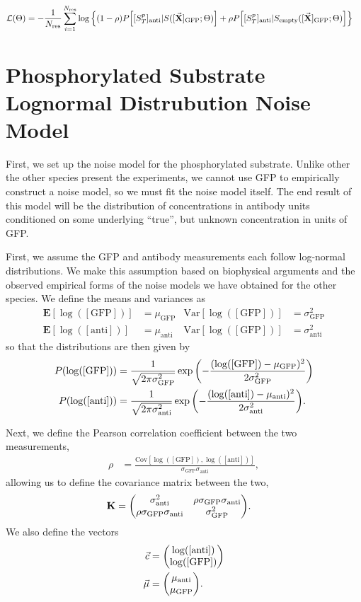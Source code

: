 \documentclass[aps,onecolumn,superscriptaddress,notitlepage]{revtex4-1}
\newcommand{\sigmaGFP}{\sigma_{\mathrm{GFP}}}
\newcommand{\sigmaanti}{\sigma_{\mathrm{anti}}}
\newcommand{\muGFP}{\mu_{\mathrm{GFP}}}
\newcommand{\muanti}{\mu_{\mathrm{anti}}}
\newcommand{\lGFP}{\log([\mathrm{GFP}])}
\newcommand{\lanti}{\log([\mathrm{anti}])}
\newcommand{\E}{\mathbf{E}}
\newcommand{\Var}{\mathrm{Var}}
\newcommand{\Cov}{\mathrm{Cov}}
\newcommand{\vbX}{\vec{\mathbf{X}}}
\begin{document}
\begin{align}
\mathcal{L}(\Theta) &= -\frac{1}{N_{\mathrm{res}}}\sum_{i=1}^{N_{\mathrm{res}}}\log \qty{(1-\rho) P\qty[ [S_T^p]_{\mathrm{anti}} |  S([\vbX]_{\mathrm{GFP}};\Theta)] +  \rho P\qty[ [S_T^p]_{\mathrm{anti}} |  S_{\mathrm{empty}}([\vbX]_{\mathrm{GFP}};\Theta)]}
\end{align}

\section{Phosphorylated Substrate Lognormal Distrubution Noise Model}

First, we set up the noise model for the phosphorylated substrate.
Unlike other the other species present the experiments,
we cannot use GFP to empirically construct a noise model,
so we must fit the noise model itself.
The end result of this model will be the distribution of concentrations in antibody units conditioned on some underlying ``true'', but unknown concentration in units of GFP.

First, we assume the GFP and antibody measurements each follow log-normal distributions. 
We make this assumption based on biophysical arguments and the observed empirical forms of the noise models we have obtained for the other species.  
We define the means and variances as
\begin{align}
\E[\lGFP] &= \muGFP & \Var[\lGFP] &= \sigmaGFP^2\\ 
\E[\lanti] &= \muanti & \Var[\lGFP]&= \sigmaanti^2
\end{align}
so that the distributions are then given by
\begin{align}
P(\lGFP) &= \frac{1}{\sqrt{2\pi\sigmaGFP^2 }}\exp\qty(-\frac{(\lGFP-\muGFP)^2}{2\sigmaGFP^2})\\
P(\lanti) &= \frac{1}{\sqrt{2\pi\sigmaanti^2 }}\exp\qty(-\frac{(\lanti-\muanti)^2}{2\sigmaanti^2}).
\end{align}

Next, we define the Pearson correlation coefficient between the two measurements,
\begin{align}
\rho &= \frac{\Cov[\lGFP, \lanti]}{\sigmaGFP\sigmaanti},
\end{align}
allowing us to define the covariance matrix between the two,
\begin{align}
\mathbf{K} &= \mqty(\sigmaanti^2 & \rho \sigmaGFP\sigmaanti\\
\rho \sigmaGFP\sigmaanti &  \sigmaGFP^2).
\end{align}
We also define the vectors
\begin{align}
\vec{c} &= \mqty(\lanti \\ \lGFP)\\
\vec{\mu} &= \mqty(\muanti \\\muGFP).
\end{align}
\end{document}
